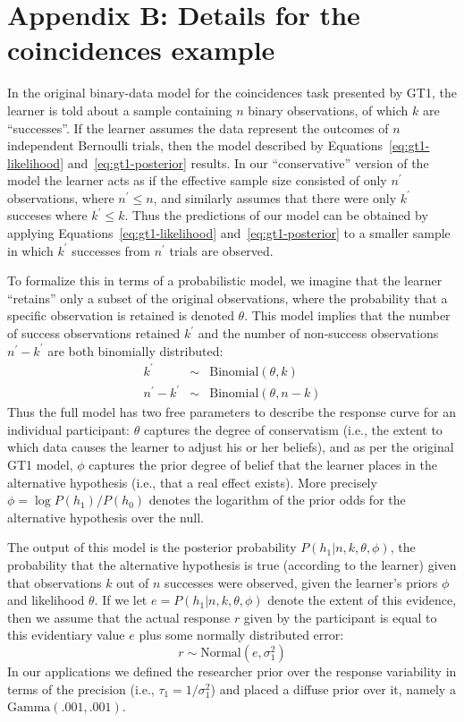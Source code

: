 \section*{Appendix B: Details for the coincidences example}

In the original binary-data model for the coincidences task presented by GT1, the learner is told about a sample containing $n$ binary observations, of which $k$ are ``successes''. If the learner assumes the data represent the outcomes of $n$ independent Bernoulli trials, then the model described by Equations~\ref{eq:gt1-likelihood} and~\ref{eq:gt1-posterior} results. In our ``conservative'' version of the model the learner acts as if the effective sample size consisted of only $n^\prime$ observations, where $n^\prime \leq n$, and similarly assumes that there were only $k^\prime$ succeses where $k^\prime \leq k$. Thus the predictions of our model can be obtained by applying Equations~\ref{eq:gt1-likelihood} and~\ref{eq:gt1-posterior} to a smaller sample in which $k^\prime$ successes from $n^\prime$ trials are observed.

To formalize this in terms of a probabilistic model, we imagine that the learner ``retains'' only a subset of the original observations, where the probability that a specific observation is retained is denoted $\theta$. This model implies that the number of success observations retained $k^\prime$ and the number of non-success observations $n^\prime - k^\prime$ are both binomially distributed:
\begin{equation}
\begin{array}{rcl}
k^\prime & \sim & \mbox{Binomial}(\theta,k) \\
n^\prime - k^\prime &\sim& \mbox{Binomial}(\theta,n-k)
\end{array}
\end{equation}
Thus the full model has two free parameters to describe the response curve for an individual participant: $\theta$ captures the degree of conservatism (i.e., the extent to which data causes the learner to adjust his or her beliefs), and as per the original GT1 model, $\phi$ captures the prior degree of belief that the learner places in the alternative hypothesis (i.e., that a real effect exists). More precisely $\phi = \log P(h_1)/P(h_0)$ denotes the logarithm of the prior odds for the alternative hypothesis over the null.

The output of this model is the posterior probability $P(h_1 | n, k, \theta, \phi)$, the probability that the alternative hypothesis is true (according to the learner) given that observations $k$ out of $n$ successes were observed, given the learner's priors $\phi$ and likelihood $\theta$. If we let $e = P(h_1 | n, k, \theta, \phi)$ denote the extent of this evidence, then we assume that the actual response $r$ given by the participant is equal to this evidentiary value $e$ plus some normally distributed error: 
\begin{equation}
r \sim \mbox{Normal}(e,\sigma_1^2)
\end{equation}
In our applications we defined the researcher prior over the response variability in terms of the precision (i.e., $\tau_1=1/\sigma_1^2$) and placed a diffuse prior over it, namely a $\mbox{Gamma}(.001,.001)$. 

